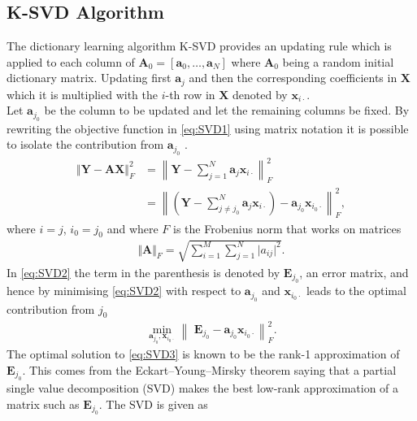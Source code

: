 \subsection{K-SVD Algorithm}
The dictionary learning algorithm K-SVD provides an updating rule which is applied to each column of $\mathbf{A}_0 = \left[ \mathbf{a}_0, \dots, \mathbf{a}_N \right] $ where $\mathbf{A}_0$ being a random initial dictionary matrix. Updating first $\mathbf{a}_j$ and then the corresponding coefficients in $\mathbf{X}$ which it is multiplied with the $i$-th row in $\mathbf{X}$ denoted by $\mathbf{x}_{i \cdot}$.
\\
Let $\mathbf{a}_{j_{0}}$ be the column to be updated and let the remaining columns be fixed. By rewriting the objective function in \eqref{eq:SVD1} using matrix notation it is possible to isolate the contribution from $\mathbf{a}_{j_{0}}$ .
\begin{align}\label{eq:SVD2} 
\Vert \textbf{Y} - \textbf{AX} \Vert_{F}^{2} 
&= \left\| \textbf{Y} - \sum_{j=1}^{N} \textbf{a}_j \textbf{x}_{i \cdot} \right\|_{F}^{2} \nonumber \\
&= \left\| \left( \textbf{Y}- \sum_{j \neq j_0}^{N} \textbf{a}_j \textbf{x}_{i \cdot} \right) - \textbf{a}_{j_{0}} \textbf{x}_{i_0 \cdot} \right\| _{F}^{2},
\end{align}
where $i = j$, $i_0 = j_0$ and where $F$ is the Frobenius norm that works on matrices
\begin{align*}
\Vert \mathbf{A} \Vert_F = \sqrt{\sum_{i=1}^M \sum_{j=1}^N \vert a_{ij} \vert^2}.
\end{align*} 
In \eqref{eq:SVD2} the term in the parenthesis is denoted by $\textbf{E}_{j_0}$, an error matrix, and hence by minimising \eqref{eq:SVD2} with respect to $\mathbf{a}_{j_0}$ and $\mathbf{x}_{i_0 \cdot}$ leads to the optimal contribution from $j_0$
\begin{align}\label{eq:SVD3}
\min_{\textbf{a}_{j_{0}}, \textbf{x}_{i_0 \cdot}}\left\|\textbf{ E}_{j_{0}} - \textbf{a}_{j_{0}} \textbf{x}_{i_0 \cdot} \right\|_{F}^{2}.
\end{align} 
The optimal solution to \eqref{eq:SVD3} is known to be the rank-1 approximation of $\textbf{E}_{j_{0}}$. This comes from the Eckart–Young–Mirsky theorem \cite{?} saying that a partial single value decomposition (SVD) makes the best low-rank approximation of a matrix such as $\textbf{E}_{j_0}$. The SVD is given as
